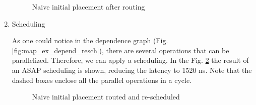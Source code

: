 \begin{enumerate}
\begin{figure}[H]
\label{fig:map_ex_routing}
\caption{Naive initial placement after routing}
\end{figure}

\item Scheduling
\label{sec:orgeafb033}

As one could notice in the dependence graph (Fig. \ref{fig:map_ex_depend_resch}), there are several operations that can be parallelized.
Therefore, we can apply a scheduling.
In the Fig. \ref{fig:map_ex_resch} the result of an ASAP scheduling is shown, reducing the latency to 1520 ns.
Note that the dashed boxes enclose all the parallel operations in a cycle.



\begin{figure}[H]
\centering


\caption{Naive initial placement routed and re-scheduled}
\label{fig:map_ex_resch}
\end{figure}



\end{enumerate}

